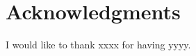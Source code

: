 \documentclass[english, bibtex]{templates/kth/kththesis}
\begin{document}
\section*{Acknowledgments }



I would like to thank xxxx for having yyyy.\\

\acknowlegmentssignature

\renewcommand{\chaptermark}[1]{ \markboth{#1}{}} 
\tableofcontents
  \markboth{\contentsname}{}

\cleardoublepage
\listoffigures

\cleardoublepage
\end{document}
